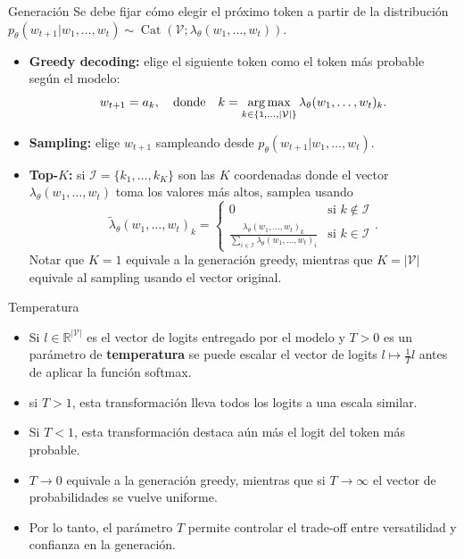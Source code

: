 \documentclass{beamer}
\newcommand{\R}{\mathbb{R}}
\begin{document}
\begin{frame}{Generación}
Se debe fijar cómo elegir el próximo token a partir de la distribución $p_\theta(w_{t+1}|w_1,\ldots,w_t)\sim\operatorname{Cat}\left(\mathcal{V};\lambda_\theta(w_1,\ldots,w_t)\right)$.
\begin{itemize}
    \item \textbf{Greedy decoding:} elige el siguiente token como el token más probable según el modelo:
    \begin{equation*}
        w_{t+1}=a_k,\quad\text{donde}\quad
k=\operatornamewithlimits{arg\,max}_{k\in\{1,\ldots,|\mathcal{V}|\}} \lambda_\theta(w_1,\ldots,w_t)_k.
    \end{equation*}
    \item \textbf{Sampling:} elige $w_{t+1}$ sampleando desde $p_\theta(w_{t+1}|w_1,\ldots,w_t)$.
    \item \textbf{Top-$K$:} si $\mathcal{I}=\{k_1,\ldots,k_K\}$ son las $K$ coordenadas donde el vector $\lambda_\theta(w_1,\ldots,w_t)$ toma los valores más altos, samplea usando
    \begin{equation*}
        \tilde\lambda_\theta(w_1,\ldots,w_t)_k=
\begin{cases}
0&\text{si }k\not\in\mathcal{I}\\
\frac{\lambda_\theta(w_1,\ldots,w_t)_k}{\sum_{i\in\mathcal{I}}\lambda_\theta(w_1,\ldots,w_t)_i}&\text{si } k\in\mathcal{I}
\end{cases}.
    \end{equation*}
    Notar que $K=1$ equivale a la generación greedy, mientras que $K=|\mathcal{V}|$ equivale al sampling usando el vector original.
\end{itemize} 
\end{frame}

\begin{frame}{Temperatura}

\begin{itemize}
    \item Si $l\in\R^{|\mathcal{V}|}$ es el vector de logits entregado por el modelo y $T>0$ es un parámetro de \textbf{temperatura} se puede escalar el vector de logits $l\mapsto \frac{1}{T}l$ antes de aplicar la función softmax.
    \item si $T>1$, esta transformación lleva todos los logits a una escala similar.
    \item Si $T<1$, esta transformación destaca aún más el logit del token más probable.
    \item $T\to 0$ equivale a la generación greedy, mientras que si $T\to\infty$ el vector de probabilidades se vuelve uniforme.
    \item Por lo tanto, el parámetro $T$ permite controlar el trade-off entre versatilidad y confianza en la generación.
\end{itemize}
\end{frame}
\end{document}
